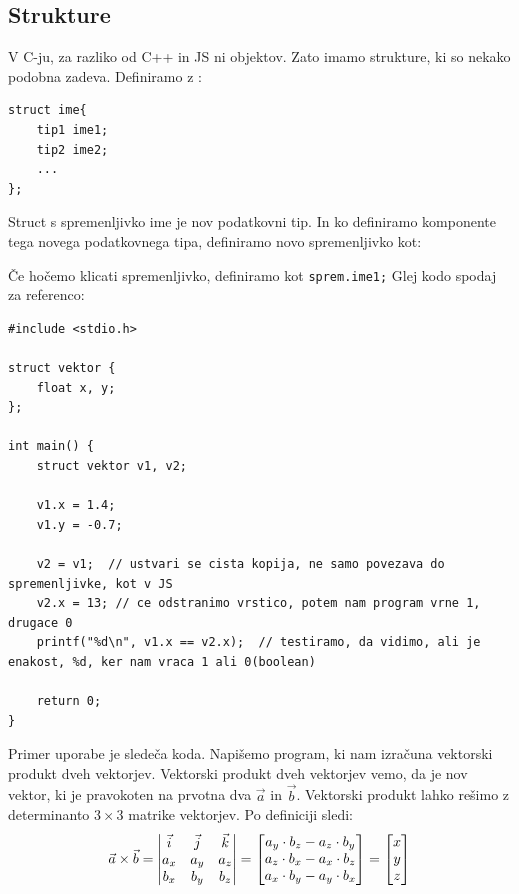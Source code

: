 \documentclass[a4paper, 12pt]{article}
\begin{document}
\pagebreak

\subsection{Strukture}\label{strukture}

V C-ju, za razliko od C++ in JS ni objektov. Zato imamo strukture, ki so nekako podobna zadeva. Definiramo z :
\begin{lstlisting}
struct ime{
	tip1 ime1;
	tip2 ime2;
	...
};
\end{lstlisting}
Struct s spremenljivko ime je nov podatkovni tip. In ko definiramo komponente tega novega podatkovnega tipa, definiramo novo spremenljivko kot:

Če hočemo klicati spremenljivko, definiramo kot \lstinline|sprem.ime1;| Glej kodo spodaj za referenco:

\begin{lstlisting}[caption = Kopiranje struktur]
#include <stdio.h>

struct vektor {
	float x, y;		
};

int main() {
	struct vektor v1, v2;

	v1.x = 1.4;	
	v1.y = -0.7;

	v2 = v1;  // ustvari se cista kopija, ne samo povezava do spremenljivke, kot v JS
	v2.x = 13; // ce odstranimo vrstico, potem nam program vrne 1, drugace 0
	printf("%d\n", v1.x == v2.x);  // testiramo, da vidimo, ali je enakost, %d, ker nam vraca 1 ali 0(boolean)
	
	return 0;
}
\end{lstlisting}

Primer uporabe  je sledeča koda. Napišemo program, ki nam izračuna vektorski produkt dveh vektorjev. Vektorski produkt dveh vektorjev vemo, da je nov vektor, ki je pravokoten na prvotna dva $\vec{a}$ in $\vec{b}$. Vektorski produkt lahko rešimo z determinanto $3 \times 3$ matrike vektorjev. Po definiciji sledi:
\begin{equation*}
\vec{a} \times \vec{b} = 
\begin{vmatrix}
\vec{i} & \vec{j} & \vec{k} \\
a_x & a_y & a_z\\ 
b_x & b_y &b_z \notag
\end{vmatrix} = 
\begin{bmatrix}
a_y\cdot b_z - a_z\cdot b_y \\
a_z\cdot b_x - a_x\cdot b_z \\
a_x\cdot b_y - a_y\cdot b_x
\end{bmatrix} = 
\begin{bmatrix}
x \\ 
y \\ 
z
\end{bmatrix}
\end{equation*}
\end{document}
